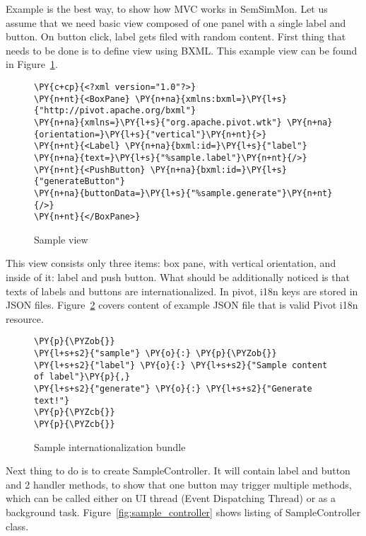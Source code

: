 Example is the best way, to show how MVC works in SemSimMon. Let us assume that we need basic view composed of one panel with a single label and button. On button click, label gets filed with random content. First thing that needs to be done is to define view using BXML. This example view can be found in Figure~\ref{fig:sample_view}.

\begin{figure}[ht]
\centering
\begin{Verbatim}[commandchars=\\\{\},frame=single,framerule=0.2pt] 
\PY{c+cp}{<?xml version="1.0"?>}
\PY{n+nt}{<BoxPane} \PY{n+na}{xmlns:bxml=}\PY{l+s}{"http://pivot.apache.org/bxml"}
\PY{n+na}{xmlns=}\PY{l+s}{"org.apache.pivot.wtk"} \PY{n+na}{orientation=}\PY{l+s}{"vertical"}\PY{n+nt}{>}
\PY{n+nt}{<Label} \PY{n+na}{bxml:id=}\PY{l+s}{"label"} \PY{n+na}{text=}\PY{l+s}{"%sample.label"}\PY{n+nt}{/>}
\PY{n+nt}{<PushButton} \PY{n+na}{bxml:id=}\PY{l+s}{"generateButton"}
\PY{n+na}{buttonData=}\PY{l+s}{"%sample.generate"}\PY{n+nt}{/>}
\PY{n+nt}{</BoxPane>}
\end{Verbatim} 
\caption{Sample view}
\label{fig:sample_view}
\end{figure}

This view consists only three items: box pane, with vertical orientation, and inside of it: label and push button. What should be additionally noticed is that texts of labels and buttons are internationalized. In pivot, i18n keys are stored in JSON files. Figure~\ref{fig:i18n} covers content of example JSON file that is valid Pivot i18n resource. 

\begin{figure}[ht]
\centering
\begin{Verbatim}[commandchars=\\\{\},frame=single,framerule=0.2pt] 
\PY{p}{\PYZob{}}
\PY{l+s+s2}{"sample"} \PY{o}{:} \PY{p}{\PYZob{}}
\PY{l+s+s2}{"label"} \PY{o}{:} \PY{l+s+s2}{"Sample content of label"}\PY{p}{,}
\PY{l+s+s2}{"generate"} \PY{o}{:} \PY{l+s+s2}{"Generate text!"}
\PY{p}{\PYZcb{}}
\PY{p}{\PYZcb{}}
\end{Verbatim} 
\caption{Sample internationalization bundle}
\label{fig:i18n}
\end{figure}

Next thing to do is to create SampleController. It will contain label and button and 2 handler methods, to show that one button may trigger multiple methods, which can be called either on UI thread (Event Dispatching Thread) or as a background task. Figure~\ref{fig:sample_controller} shows listing of SampleController class.

